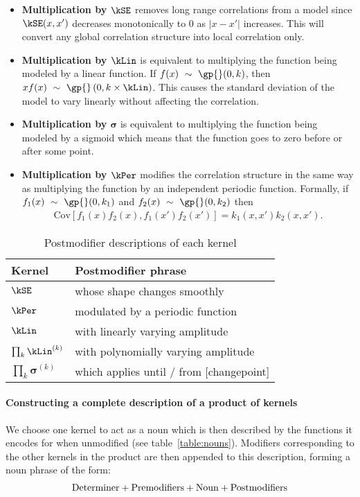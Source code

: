 \begin{itemize}
\item {\bf Multiplication by $\kSE$} removes long range correlations from a model since $\kSE(x,x')$ decreases monotonically to 0 as $|x - x'|$ increases.
This will convert any global correlation structure into local correlation only.
\item {\bf Multiplication by $\kLin$} is equivalent to multiplying the function being modeled by a linear function.
If $f(x) \dist \gp{}(0, \kernel)$, then $xf(x) \dist \gp{}\left(0, k \times \kLin \right)$.
This causes the standard deviation of the model to vary linearly without affecting the correlation.
\item {\bf Multiplication by $\boldsymbol\sigma$} is equivalent to multiplying the function being modeled by a sigmoid which means that the function goes to zero before or after some point.
\item {\bf Multiplication by $\kPer$}
modifies the correlation structure in the same way as multiplying the function by an independent periodic function.
Formally, if ${f_1(x) \dist \gp{}(0, \kernel_1)}$ and ${f_2(x) \dist \gp{}(0, \kernel_2)}$ then
\begin{align}
{\textrm{Cov} \left[f_1(x)f_2(x), f_1(x')f_2(x') \right] = k_1(x,x')k_2(x,x')}.\nonumber
\end{align}
\end{itemize}

\begin{table}[ht]
\centering
\begin{tabular}{l|l}
Kernel & Postmodifier phrase \\
\midrule
$\kSE$  & whose shape changes smoothly \\
$\kPer$ & modulated by a periodic function \\
$\kLin$ & with linearly varying amplitude \\
$\prod_k \kLin^{(k)}$ & with polynomially varying amplitude \\
$\prod_k \boldsymbol{\sigma}^{(k)}$ & which applies until / from [changepoint] \\
\end{tabular}
\caption{
Postmodifier descriptions of each kernel
}
\label{table:modifiers}
\end{table}

\paragraph{Constructing a complete description of a product of kernels}
We choose one kernel to act as a noun which is then described by the functions it encodes for when unmodified (see table~\ref{table:nouns}).
Modifiers corresponding to the other kernels in the product are then appended to this description, forming a noun phrase of the form:
\begin{align*}
\textnormal{Determiner}	+	\textnormal{Premodifiers} +	\textnormal{Noun}	+	\textnormal{Postmodifiers}
\end{align*}

